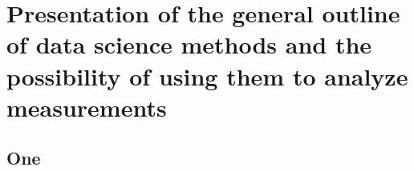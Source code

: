 \chapter{Presentation of the general outline of data science methods and the possibility of using them to analyze measurements}

\section{One}
